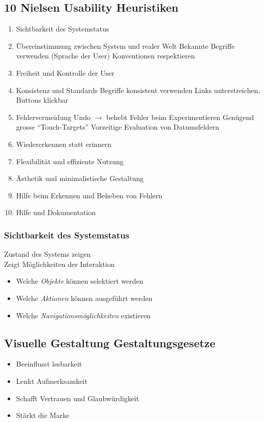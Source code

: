 \documentclass[a4paper, landscape, 8pt]{scrartcl}
\begin{document}
\begin{multicols*}{4}
        \subsection{10 Nielsen Usability Heuristiken}
        \begin{enumerate}[label=\color{subsectioncolor}\theenumi]
            \item Sichtbarkeit des Systemstatus
            \item Übereinstimmung zwischen System und realer Welt
            \subitem Bekannte Begriffe verwenden (Sprache der User)
            \subitem Konventionen respektieren
            \item Freiheit und Kontrolle der User
            \item Konsistenz und Standards
            \subitem Begriffe konsistent verwenden
            \subitem Links unterstreichen, Buttons klickbar
            \item Fehlervermeidung
            \subitem Undo $\to$ behebt Fehler beim Experimentieren
            \subitem Genügend grosse \enquote{Touch-Targets}
            \subitem Vorzeitige Evaluation von Datumsfeldern
            \item Wiedererkennen statt erinnern
            \item Flexibilität und effiziente Nutzung
            \item Ästhetik und minimalistische Gestaltung
            \item Hilfe beim Erkennen und Beheben von Fehlern
            \item Hilfe und Dokumentation
        \end{enumerate}

        \subsubsection{Sichtbarkeit des Systemstatus}
        Zustand des Systems zeigen \\
        Zeigt Möglichkeiten der Interaktion
        \begin{itemize}
            \item Welche \textit{Objekte} können selektiert werden
            \item Welche \textit{Aktionen} können ausgeführt werden
            \item Welche \textit{Navigationsmöglichkeiten} existieren
        \end{itemize}

        \subsection{Visuelle Gestaltung {\tiny Gestaltungsgesetze}}
        \begin{itemize}
            \item Beeinflusst lesbarkeit
            \item Lenkt Aufmerksamkeit
            \item Schafft Vertrauen und Glaubwürdigkeit
            \item Stärkt die Marke
        \end{itemize}


\end{multicols*}
\end{document}
